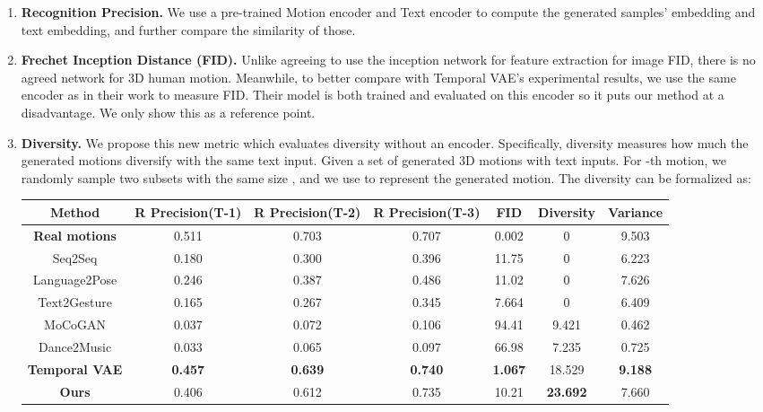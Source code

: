 \documentclass{article}
\begin{document}
\begin{enumerate}
  \item \textbf{Recognition Precision.} We use a pre-trained Motion encoder and Text encoder to compute the generated samples' embedding and text embedding, and further compare the similarity of those.
  \item \textbf{Frechet Inception Distance (FID).} Unlike agreeing to use the inception network for feature extraction for image FID, there is no agreed network for 3D human motion. Meanwhile, to better compare with Temporal VAE's experimental results, we use the same encoder as in their work to measure FID. Their model is both trained and evaluated on this encoder so it puts our method at a disadvantage. We only show this as a reference point.
  \item \textbf{Diversity.} We propose this new metric which evaluates diversity without an encoder. Specifically, diversity measures how much the generated motions diversify with the same text input. Given a set of generated 3D motions with  text inputs. For -th motion, we randomly sample two subsets with the same size , and we use  to represent the generated motion. The diversity can be formalized as:

  
 \begin{table*}[ht!]
    \vspace{-4.5em}\centering
  \begin{tabular}{|c c c c c c c|}
  \hline
  \textbf{Method} & \textbf{R Precision(T-1)} & \textbf{R Precision(T-2)} & \textbf{R Precision(T-3)} & \textbf{FID} & \textbf{Diversity} & \textbf{Variance} \\ [0.5ex] 
  \hline\hline
  \textbf{Real motions} & 0.511 & 0.703 & 0.707 & 0.002 & 0 & 9.503\\
  \hline
  Seq2Seq \cite{linvigil18} & 0.180 & 0.300 & 0.396 & 11.75 & 0 & 6.223 \\
  Language2Pose \cite{ahuja2019language2pose} & 0.246 & 0.387 & 0.486 & 11.02 & 0 & 7.626 \\
  Text2Gesture \cite{bhattacharya2021text2gestures} & 0.165 & 0.267 & 0.345 & 7.664 & 0 & 6.409 \\
  MoCoGAN \cite{tulyakov2018mocogan} & 0.037 &0.072 & 0.106 & 94.41 & 9.421 & 0.462 \\
  Dance2Music \cite{tang2018dance} & 0.033 & 0.065 & 0.097 & 66.98 & 7.235 & 0.725\\
  \textbf{Temporal VAE} \cite{guo2022generating} & \textbf{0.457} & \textbf{0.639} & \textbf{0.740} & \textbf{1.067} & 18.529 & \textbf{9.188} \\
  \hline
  \textbf{Ours} & 0.406 & 0.612 & 0.735 & 10.21 & \textbf{23.692} & 7.660\\
    \hline
 

\end{tabular}
\end{table*}
\end{enumerate}
\end{document}

